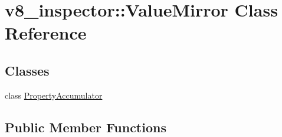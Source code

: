 \hypertarget{classv8__inspector_1_1ValueMirror}{}\section{v8\+\_\+inspector\+:\+:Value\+Mirror Class Reference}
\label{classv8__inspector_1_1ValueMirror}
\subsection*{Classes}
\begin{DoxyCompactItemize}
\item 
class \mbox{\hyperlink{classv8__inspector_1_1ValueMirror_1_1PropertyAccumulator}{Property\+Accumulator}}
\end{DoxyCompactItemize}
\subsection*{Public Member Functions}
